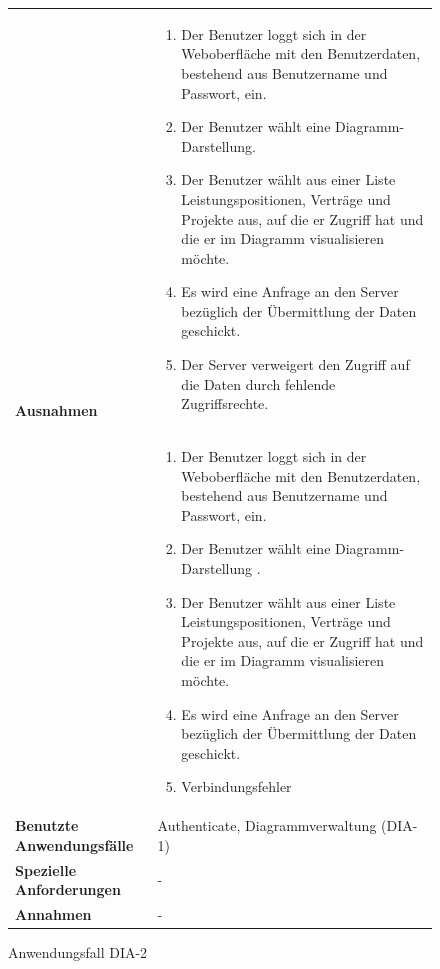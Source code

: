 \begin{figure}[h]
	\centering
	\begin{tabularx}{\textwidth}{ X | X }
		\multirow{2}{*}{\textbf{Ausnahmen}} &
		\begin{enumerate} %
			\item Der Benutzer loggt sich in der Weboberfläche mit den Benutzerdaten, bestehend aus Benutzername und Passwort, ein.
			\item Der Benutzer wählt eine Diagramm-Darstellung.
			\item Der Benutzer wählt aus einer Liste Leistungspositionen, Verträge und Projekte aus, auf die er Zugriff hat und die er im Diagramm visualisieren möchte.
			\item Es wird eine Anfrage an den Server bezüglich der Übermittlung der Daten geschickt.
			\item Der Server verweigert den Zugriff auf die Daten durch fehlende Zugriffsrechte.
		\end{enumerate} \\\cline{2-2} &
		\begin{enumerate} %
			\item Der Benutzer loggt sich in der Weboberfläche mit den Benutzerdaten, bestehend aus Benutzername und Passwort, ein.
			\item Der Benutzer wählt eine Diagramm-Darstellung .
			\item Der Benutzer wählt aus einer Liste Leistungspositionen, Verträge und Projekte aus, auf die er Zugriff hat und die er im Diagramm visualisieren möchte.
			\item Es wird eine Anfrage an den Server bezüglich der Übermittlung der Daten geschickt.
			\item Verbindungsfehler
		\end{enumerate}  \\ \hline
		\textbf{Benutzte Anwendungsfälle} & Authenticate, Diagrammverwaltung (DIA-1)\\ \hline
		\textbf{Spezielle Anforderungen} & - \\ \hline
		\textbf{Annahmen} & -
	\end{tabularx}
	\caption{Anwendungsfall DIA-2}
	\label{fig:anwendungsfall-DIA-2}
\end{figure}
